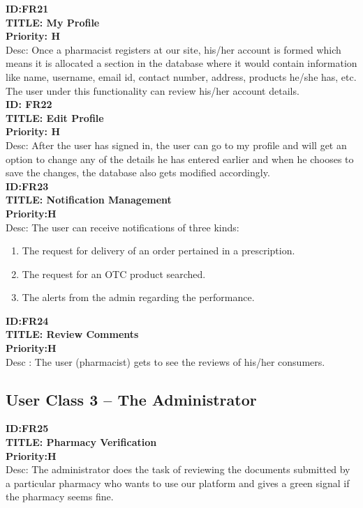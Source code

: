 \documentclass{scrreprt}
\begin{document}
 \textbf{ID:FR21}\\
 \textbf{TITLE: My Profile}\\
 \textbf{Priority: H}\\
Desc: Once a pharmacist registers at our site, his/her account is formed which means it is allocated a section in the database where it would contain information like name, username, email id, contact number, address, products he/she has, etc. The user under this functionality can review his/her account details.\\

 \textbf{ID: FR22}\\
 \textbf{TITLE: Edit Profile}\\
\textbf{Priority: H}\\
Desc:  After the user has signed in, the user can go to my profile and will get an option to change any of the details he has entered earlier  and when he chooses to save the changes, the database also gets modified accordingly.\\

 \textbf{ID:FR23}\\
 \textbf{TITLE: Notification Management}\\
 \textbf{Priority:H}\\
Desc: The user can receive notifications of three kinds:  
\begin{enumerate}
\item	The request for delivery of an order pertained in a prescription.  
\item	The request for an OTC product searched.   
\item	The alerts from the admin regarding the performance.   
\end{enumerate}

 \textbf{ID:FR24}\\
 \textbf{TITLE: Review Comments}\\
 \textbf{Priority:H}\\
Desc : The user (pharmacist) gets to see the reviews of his/her consumers.\\

\subsection{User Class 3 – The Administrator}

 \textbf{ID:FR25}\\
\textbf{TITLE: Pharmacy Verification}\\
 \textbf{Priority:H}\\
Desc: The administrator does the task of reviewing the documents submitted by a particular pharmacy who wants to use our platform and gives a green signal if the pharmacy seems fine.\\
\end{document}
